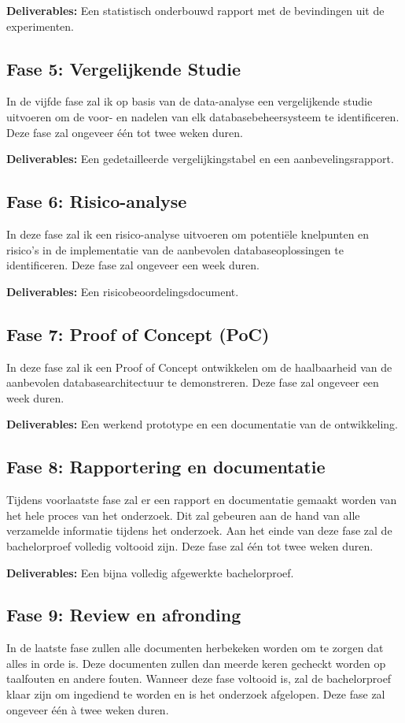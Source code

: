 \textbf{Deliverables:} Een statistisch onderbouwd rapport met de bevindingen uit de experimenten.

\subsection{Fase 5: Vergelijkende Studie}
\label{subsec:vergelijkendestudie}
In de vijfde fase zal ik op basis van de data-analyse een vergelijkende studie uitvoeren om de voor- en nadelen van elk databasebeheersysteem te identificeren. Deze fase zal ongeveer één tot twee weken duren.

\textbf{Deliverables:} Een gedetailleerde vergelijkingstabel en een aanbevelingsrapport.

\subsection{Fase 6: Risico-analyse}
\label{subsec:risicoanalyse}
In deze fase zal ik een risico-analyse uitvoeren om potentiële knelpunten en risico's in de implementatie van de aanbevolen databaseoplossingen te identificeren. Deze fase zal ongeveer een week duren.

\textbf{Deliverables:} Een risicobeoordelingsdocument.

\subsection{Fase 7: Proof of Concept (PoC)}
\label{subsec:poc}
In deze fase zal ik een Proof of Concept ontwikkelen om de haalbaarheid van de aanbevolen databasearchitectuur te demonstreren. Deze fase zal ongeveer een week duren.

\textbf{Deliverables:} Een werkend prototype en een documentatie van de ontwikkeling.

\subsection{Fase 8: Rapportering en documentatie}
\label{subsec:rapporteringendocumentatie}
Tijdens voorlaatste fase zal er een rapport en documentatie gemaakt worden van het hele proces
van het onderzoek. Dit zal gebeuren aan de hand van alle verzamelde informatie tijdens het onderzoek. Aan het einde van deze fase zal de bachelorproef volledig voltooid zijn. Deze fase zal één tot twee weken duren.

\textbf{Deliverables:} Een bijna volledig afgewerkte bachelorproef.

\subsection{Fase 9: Review en afronding}
\label{subsec:reviewenafronding}
In de laatste fase zullen alle documenten herbekeken worden om te zorgen dat alles in orde is. Deze
documenten zullen dan meerde keren gecheckt worden op taalfouten en andere fouten. Wanneer deze fase voltooid is, zal de bachelorproef klaar zijn om ingediend te worden en is het onderzoek afgelopen. Deze fase zal ongeveer één à
twee weken duren.

